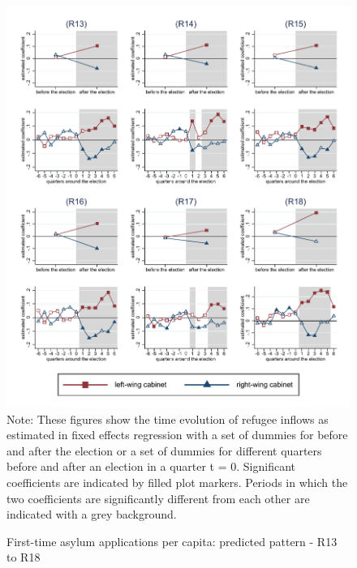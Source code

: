 \documentclass[11pt,a4paper]{scrartcl}
\begin{document}
\clearpage
\FloatBarrier


\clearpage
\FloatBarrier
\begin{figure}[!ht]
	\caption{First-time asylum applications per capita: predicted pattern - R13 to R18}
	\includegraphics[width=1\textwidth]{../results/applications/app_graphs_R13-R18.pdf}
	\scriptsize{Note: These figures show the time evolution of refugee inflows as estimated in fixed effects regression
		with a set of dummies for before and after the election or a set of dummies for different quarters before and after an election in a quarter t = 0. Significant coefficients are indicated by filled plot markers. Periods in which the two coefficients are significantly different from each other are indicated with a grey background.}
\end{figure}

%
%
%
%
%
%
\end{document}
